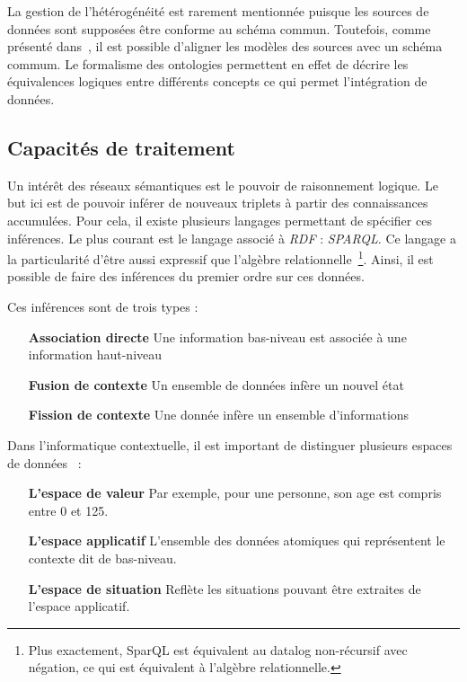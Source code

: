 La gestion de l'hétérogénéité est rarement mentionnée puisque les sources de données sont supposées être conforme au schéma commun. Toutefois, comme présenté dans~\cite{Kaed:these}, il est possible d'aligner les modèles des sources avec un schéma commum. Le formalisme des ontologies permettent en effet de décrire les équivalences logiques entre différents concepts ce qui permet l'intégration de données.

\subsection{Capacités de traitement}
Un intérêt des réseaux sémantiques est le pouvoir de raisonnement logique. Le but ici est de pouvoir inférer de nouveaux triplets à partir des connaissances accumulées. Pour cela, il existe plusieurs langages permettant de spécifier ces inférences. Le plus courant est le langage associé à \textit{RDF} : \textit{SPARQL}. Ce langage a la particularité d'être aussi expressif que l'algèbre relationnelle~\cite{Angles:sparql}\footnote{Plus exactement, SparQL est équivalent au datalog non-récursif avec négation, ce qui est équivalent à l'algèbre relationnelle.}. Ainsi, il est possible de faire des inférences du premier ordre sur ces données.

Ces inférences sont de trois types :
\begin{itemize}
 \item[\textbf{Association directe}] Une information bas-niveau est associée à une information haut-niveau 
 \item[\textbf{Fusion de contexte}] Un ensemble de données infère un nouvel état 
 \item[\textbf{Fission de contexte}] Une donnée infère un ensemble d'informations
\end{itemize}

Dans l'informatique contextuelle, il est important de distinguer plusieurs espaces de données~\cite{Padovitz:agent} :
\begin{itemize}
 \item[\textbf{L'espace de valeur}] Par exemple, pour une personne, son age est compris entre 0 et 125.
 \item[\textbf{L'espace applicatif}] L'ensemble des données atomiques qui représentent le contexte dit de bas-niveau.
 \item[\textbf{L'espace de situation}] Reflète les situations pouvant être extraites de l'espace applicatif.
\end{itemize}


